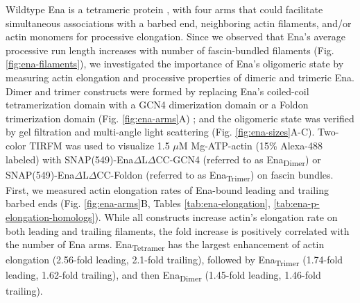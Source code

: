 Wildtype Ena is a tetrameric protein \citep{kuhnel_vasp_2004, winkelman_ena/vasp_2014}, with four arms that could facilitate simultaneous associations with a barbed end, neighboring actin filaments, and/or actin monomers for processive elongation. Since we observed that Ena's average processive run length increases with number of fascin-bundled filaments (Fig. \ref{fig:ena-filaments}), we investigated the importance of Ena's oligomeric state by measuring actin elongation and processive properties of dimeric and trimeric Ena. Dimer and trimer constructs were formed by replacing Ena's coiled-coil tetramerization domain with a GCN4 dimerization domain \citep{harbury_switch_1993} or a Foldon trimerization domain (Fig. \ref{fig:ena-arms}A) \citep{guthe_very_2004, papanikolopoulou_formation_2004}; and the oligomeric state was verified by gel filtration and multi-angle light scattering (Fig. \ref{fig:ena-sizes}A-C). Two-color TIRFM was used to visualize 1.5 $\mu$M Mg-ATP-actin (15\% Alexa-488 labeled) with SNAP(549)-Ena$\Delta$L$\Delta$CC-GCN4 (referred to as Ena\textsubscript{Dimer}) or SNAP(549)-Ena$\Delta$L$\Delta$CC-Foldon (referred to as Ena\textsubscript{Trimer}) on fascin bundles. First, we measured actin elongation rates of Ena-bound leading and trailing barbed ends (Fig. \ref{fig:ena-arms}B, Tables \ref{tab:ena-elongation}, \ref{tab:ena-p-elongation-homologs}). While all constructs increase actin's elongation rate on both leading and trailing filaments, the fold increase is positively correlated with the number of Ena arms. Ena\textsubscript{Tetramer} has the largest enhancement of actin elongation (2.56-fold leading, 2.1-fold trailing), followed by Ena\textsubscript{Trimer} (1.74-fold leading, 1.62-fold trailing), and then Ena\textsubscript{Dimer} (1.45-fold leading, 1.46-fold trailing). 

